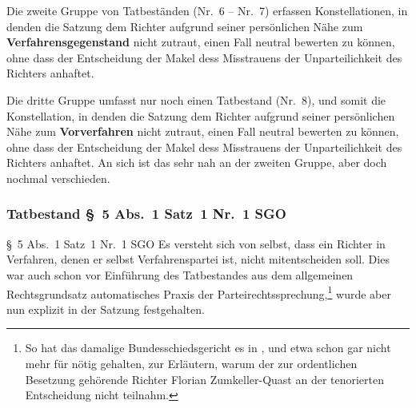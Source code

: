Die zweite Gruppe von Tatbeständen (Nr.~6 -- Nr.~7) erfassen Konstellationen, in denden die Satzung dem Richter aufgrund seiner persönlichen Nähe zum \textbf{Verfahrensgegenstand} nicht zutraut, einen Fall neutral bewerten zu können, ohne dass der Entscheidung der Makel dess Misstrauens der Unparteilichkeit des Richters anhaftet.

Die dritte Gruppe umfasst nur noch einen Tatbestand (Nr.~8), und somit die Konstellation, in denden die Satzung dem Richter aufgrund seiner persönlichen Nähe zum \textbf{Vorverfahren} nicht zutraut, einen Fall neutral bewerten zu können, ohne dass der Entscheidung der Makel dess Misstrauens der Unparteilichkeit des Richters anhaftet. An sich ist das sehr nah an der zweiten Gruppe, aber doch nochmal verschieden.

\subsubsection{Tatbestand \S~5 Abs.~1 Satz~1 Nr.~1 SGO}
\label{Zusammensetzung:Spruchkoerper:Befangenheitsvermutung:Nr1}
\S~5 Abs.~1 Satz~1 Nr.~1 SGO
Es versteht sich von selbst, dass ein Richter in Verfahren, denen er selbst Verfahrenspartei ist, nicht mitentscheiden soll.
Dies war auch schon vor Einführung des Tatbestandes aus dem allgemeinen Rechtsgrundsatz automatisches Praxis der Parteirechtssprechung,\footnote{So hat das damalige Bundesschiedsgericht es in \cite{BSG3014HS}, \cite{BSG4414HS} und \cite{BSG3215HS} etwa schon gar nicht mehr für nötig gehalten, zur Erläutern, warum der zur ordentlichen Besetzung gehörende Richter Florian Zumkeller-Quast an der tenorierten Entscheidung nicht teilnahm.} wurde aber nun explizit in der Satzung festgehalten.

